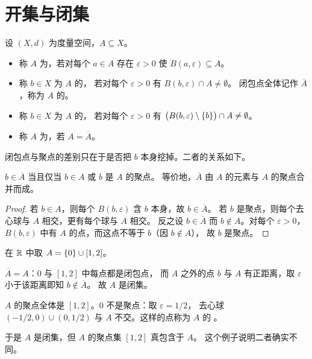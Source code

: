 \section{开集与闭集}
\label{sec:open-closed}

\begin{definition}[开集与闭集]
  \label{def:open-closed}
  设 \((X,d)\) 为度量空间，\(A \subseteq X\)。
  \begin{itemize}
    \item 称 \(A\) 为，若对每个 \(a \in A\) 存在
          \(\varepsilon > 0\) 使 \(B(a,\varepsilon) \subseteq A\)。
    \item 称 \(b \in X\) 为 \(A\) 的，
          若对每个 \(\varepsilon > 0\) 有 \(B(b,\varepsilon) \cap A \neq \emptyset\)。
          闭包点全体记作 \(\overline{A}\)，称为 \(A\) 的。
    \item 称 \(b \in X\) 为 \(A\) 的，
          若对每个 \(\varepsilon > 0\) 有 \(\bigl(B(b,\varepsilon)\setminus\left\{b\right\}\bigr) \cap A \neq \emptyset\)。
    \item 称 \(A\) 为，若 \(A = \overline{A}\)。
  \end{itemize}
\end{definition}

闭包点与聚点的差别只在于是否把 \(b\) 本身挖掉。二者的关系如下。

\begin{proposition}
  \label{prop:closure-vs-limit}
  \(b \in \overline{A}\) 当且仅当 \(b \in A\) 或 \(b\) 是 \(A\) 的聚点。
  等价地，\(\overline{A}\) 由 \(A\) 的元素与 \(A\) 的聚点合并而成。
\end{proposition}

\begin{proof}
  若 \(b \in A\)，则每个 \(B(b,\varepsilon)\) 含 \(b\) 本身，故 \(b \in \overline{A}\)。
  若 \(b\) 是聚点，则每个去心球与 \(A\) 相交，更有每个球与 \(A\) 相交。
  反之设 \(b \in \overline{A}\) 而 \(b \notin A\)。对每个 \(\varepsilon>0\)，
  \(B(b,\varepsilon)\) 中有 \(A\) 的点，而这点不等于 \(b\)（因 \(b \notin A\)），
  故 \(b\) 是聚点。
\end{proof}

\begin{example}
  \label{ex:closure-examples}
  在 \(\mathbb{R}\) 中取 \(A = \left\{0\right\} \cup [1,2]\)。
  \begin{worked}
    \(\overline{A} = A\)：\(0\) 与 \([1,2]\) 中每点都是闭包点，
    而 \(A\) 之外的点 \(b\) 与 \(A\) 有正距离，取 \(\varepsilon\) 小于该距离即知 \(b \notin \overline{A}\)。
    故 \(A\) 是闭集。

    \(A\) 的聚点全体是 \([1,2]\)。\(0\) 不是聚点：取 \(\varepsilon = 1/2\)，
    去心球 \((-1/2,0)\cup(0,1/2)\) 与 \(A\) 不交。这样的点称为 \(A\) 的%
    。

    于是 \(A\) 是闭集，但 \(A\) 的聚点集 \([1,2]\) 真包含于 \(A\)。
    这个例子说明二者确实不同。
  \end{worked}
\end{example}

